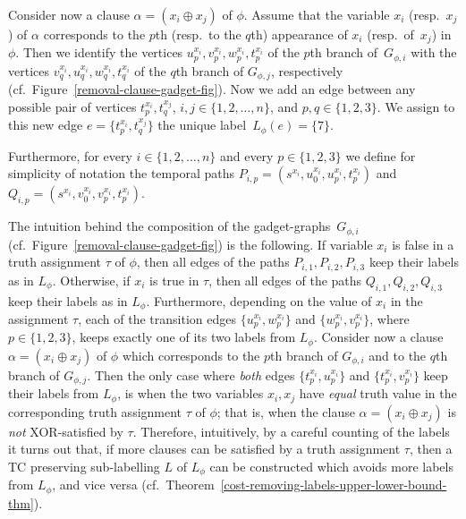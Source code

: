 \documentclass[a4paper,UKenglish]{article}
\begin{document}
Consider now a clause ${\alpha =(x_{i}\oplus x_{j})}$ of $\phi $. Assume that
the variable $x_{i}$ (resp.~$x_{j}$) of $\alpha $ corresponds to
the $p$th (resp.~to the $q$th) appearance of $x_{i}$ (resp.~of~$x_{j}$) in~$\phi $. Then we identify the vertices ${u_{p}^{x_{i}},v_{p}^{x_{i}},w_{p}^{x_{i}},t_{p}^{x_{i}}}$ 
of the $p$th branch of~$G_{\phi ,i}$ with the vertices $v_{q}^{x_{i}},u_{q}^{x_{i}},w_{q}^{x_{i}},t_{q}^{x_{i}}$ of the $q$th branch
of $G_{\phi ,j}$, respectively (cf.~Figure~\ref{removal-clause-gadget-fig}). 
Now we add an edge between any
possible pair of vertices $t_{p}^{x_{i}},t_{q}^{x_{j}}$, $i,j\in \{1,2,\ldots ,n\}$, and $p,q\in \{1,2,3\}$.
We assign to this new edge $e=  \{  t_{p}^{x_{i}}  ,  t_{q}^{x_{j}}  \}$ the unique label~$L _{\phi}(e)=\{7\}$.


Furthermore, for every $i\in \{1,2,\ldots ,n\}$ and every $p\in
\{1,2,3\}$ we define for simplicity of notation the temporal paths $P_{i,p}=(s^{x_{i}},u_{0}^{x_{i}},u_{p}^{x_{i}},t_{p}^{x_{i}})$ and $Q_{i,p}=(s^{x_{i}},v_{0}^{x_{i}},v_{p}^{x_{i}},t_{p}^{x_{i}})$.
 

The intuition behind the composition of the gadget-graphs~$G_{\phi,i}$ 
(cf.~Figure~\ref{removal-clause-gadget-fig}) is the following. 
If variable $x_{i}$ is false in a truth assignment $\tau$ of $\phi$, 
then all edges of the paths $P_{i,1},P_{i,2},P_{i,3}$ keep their labels as in $L_{\phi}$. 
Otherwise, if $x_{i}$ is true in $\tau$, 
then all edges of the paths $Q_{i,1},Q_{i,2},Q_{i,3}$ keep their labels as in $L_{\phi}$. 
Furthermore, depending on the value of $x_{i}$ in the assignment $\tau$, 
each of the transition edges $\{u_{p}^{x_{i}},w_{p}^{x_{i}}\}$ and $\{w_{p}^{x_{i}},v_{p}^{x_{i}}\}$, 
where $p\in\{1,2,3\}$, keeps exactly one of its two labels from $L_{\phi}$. 
Consider now a clause ${\alpha =(x_{i}\oplus x_{j})}$ of $\phi$ which corresponds to the 
$p$th branch of $G_{\phi,i}$ and to the $q$th branch of $G_{\phi,j}$. 
Then the only case where \emph{both} edges 
$\{t_{p}^{x_{i}},u_{p}^{x_{i}}\}$ and $\{t_{p}^{x_{i}},v_{p}^{x_{i}}\}$ keep their labels from $L_{\phi}$,
is when the two variables $x_{i},x_{j}$ have \emph{equal} truth value in the 
corresponding truth assignment $\tau$ of $\phi$; 
that is, when the clause ${\alpha =(x_{i}\oplus x_{j})}$ is \emph{not} XOR-satisfied by $\tau$. 
Therefore, intuitively, by a careful counting of the labels it turns out that, if more clauses can be satisfied by a truth assignment $\tau$, then a TC preserving sub-labelling $L$ of $L_\phi$ can be constructed which avoids more labels from $L_{\phi}$, and vice versa (cf.~Theorem~\ref{cost-removing-labels-upper-lower-bound-thm}). 
\end{document}
